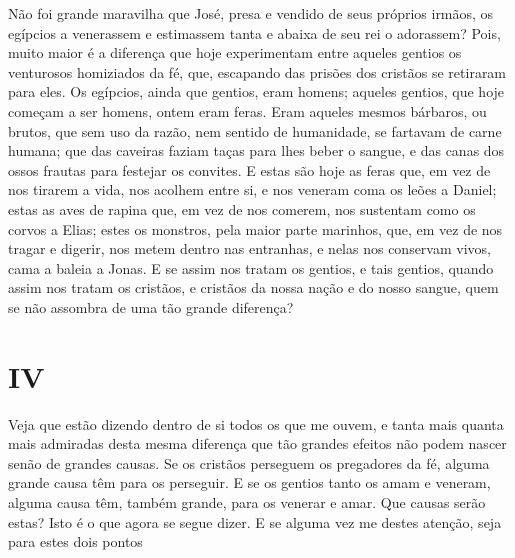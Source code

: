 Não foi grande maravilha que José, presa e vendido de seus próprios
irmãos, os egípcios a venerassem e estimassem tanta e abaixa de seu rei
o adorassem? Pois, muito maior é a diferença que hoje experimentam entre
aqueles gentios os venturosos homiziados da fé, que, escapando das
prisões dos cristãos se retiraram para eles. Os egípcios, ainda que
gentios, eram homens; aqueles gentios, que hoje começam a ser homens,
ontem eram feras. Eram aqueles mesmos bárbaros, ou brutos, que sem uso
da razão, nem sentido de humanidade, se fartavam de carne humana; que
das caveiras faziam taças para lhes beber o sangue, e das canas dos
ossos frautas para festejar os convites. E estas são hoje as feras que,
em vez de nos tirarem a vida, nos acolhem entre si, e nos veneram coma
os leões a Daniel; estas as aves de rapina que, em vez de nos comerem,
nos sustentam como os corvos a Elias; estes os monstros, pela maior
parte marinhos, que, em vez de nos tragar e digerir, nos metem dentro
nas entranhas, e nelas nos conservam vivos, cama a baleia a Jonas. E se
assim nos tratam os gentios, e tais gentios, quando assim nos tratam os
cristãos, e cristãos da nossa nação e do nosso sangue, quem se não
assombra de uma tão grande diferença?

\section{IV}

Veja que estão dizendo dentro de si todos os que me ouvem, e tanta mais
quanta mais admiradas desta mesma diferença que tão grandes efeitos não
podem nascer senão de grandes causas. Se os cristãos perseguem os
pregadores da fé, alguma grande causa têm para os perseguir. E se os
gentios tanto os amam e veneram, alguma causa têm, também grande, para
os venerar e amar. Que causas serão estas? Isto é o que agora se segue
dizer. E se alguma vez me destes atenção, seja para estes dois pontos


